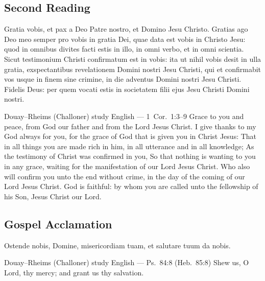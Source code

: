 \subsection{Second Reading}\label{proper-second-reading}
\begin{latinproper}
Gratia vobis, et pax a Deo Patre nostro, et Domino Jesu Christo. Gratias ago Deo meo semper pro vobis in gratia Dei, quae data est vobis in Christo Jesu: quod in omnibus divites facti estis in illo, in omni verbo, et in omni scientia. Sicut testimonium Christi confirmatum est in vobis: ita ut nihil vobis desit in ulla gratia, exspectantibus revelationem Domini nostri Jesu Christi, qui et confirmabit vos usque in finem sine crimine, in die adventus Domini nostri Jesu Christi. Fidelis Deus: per quem vocati estis in societatem filii ejus Jesu Christi Domini nostri.
\end{latinproper}
\begin{englishwitness}{Douay--Rheims (Challoner) study English --- 1~Cor.~1:3--9}
Grace to you and peace, from God our father and from the Lord Jesus Christ. I give thanks to my God always for you, for the grace of God that is given you in Christ Jesus: That in all things you are made rich in him, in all utterance and in all knowledge; As the testimony of Christ was confirmed in you, So that nothing is wanting to you in any grace, waiting for the manifestation of our Lord Jesus Christ. Who also will confirm you unto the end without crime, in the day of the coming of our Lord Jesus Christ. God is faithful: by whom you are called unto the fellowship of his Son, Jesus Christ our Lord.
\end{englishwitness}

\subsection{Gospel Acclamation}\label{proper-gospel-acclamation}
\begin{latinproper}
Ostende nobis, Domine, misericordiam tuam, et salutare tuum da nobis.
\end{latinproper}
\begin{englishwitness}{Douay--Rheims (Challoner) study English --- Ps.~84:8 (Heb.~85:8)}
Shew us, O Lord, thy mercy; and grant us thy salvation.
\end{englishwitness}

